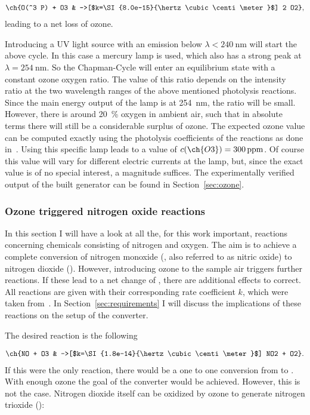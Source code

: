 \begin{align*}
  \ch{O(^3 P) + O3 & ->[$k=\SI{8.0e-15}{\hertz\cubic\centi\meter}$] 2 O2},
\end{align*}
leading to a net loss of ozone. 

Introducing a UV light source with an emission below
$\lambda < \SI{240}{\nano\meter}$ will start the above cycle. In this
case a mercury lamp is used, which also has a strong peak at
$\lambda = \SI{254}{\nano\meter}$. So the Chapman-Cycle will enter an
equilibrium state with a constant ozone oxygen ratio. The value of
this ratio depends on the intensity ratio at the two wavelength ranges
of the above mentioned photolysis reactions. Since the main energy
output of the lamp is at \SI{254}{\nano\meter}, the ratio will be
small. However, there is around \SI{20}{\%} oxygen in ambient air,
such that in absolute terms there will still be a considerable surplus
of ozone. The expected ozone value can be computed exactly using the
photolysis coefficients of the reactions as done
in~\cite{bsc}. Using this specific lamp leads to a value of
$c(\ch{O3}) = \SI{300}{ppm}$. Of course this value will vary for
different electric currents at the lamp, but, since the exact value is
of no special interest, a magnitude suffices. The experimentally
verified output of the built generator can be found in
Section~\ref{sec:ozone}.

\subsubsection{Ozone triggered nitrogen oxide reactions}
\label{sec:o-no}

In this section I will have a look at all the, for this work
important, reactions concerning chemicals consisting of nitrogen and
oxygen. The aim is to achieve a complete conversion of nitrogen
monoxide (, also referred to as nitric oxide) to nitrogen
dioxide (). However, introducing ozone to the sample air
triggers further reactions. If these lead to a net change of ,
there are additional effects to correct. All reactions are given with
their corresponding rate coefficient $k$, which were taken
from~\cite{bsc}. In Section~\ref{sec:requirements} I will discuss the
implications of these reactions on the setup of the converter.

The desired reaction is the following

\begin{align}
  \ch{NO + O3 & ->[$k=\SI{1.8e-14}{\hertz\cubic\centi\meter}$] NO2
                + O2}. \label{eq:no}
\end{align}
If this were the only reaction, there would be a one to one conversion
from  to . With enough ozone the goal of the converter
would be achieved. However, this is not the case. Nitrogen dioxide
itself can be oxidized by ozone to generate nitrogen trioxide
():

